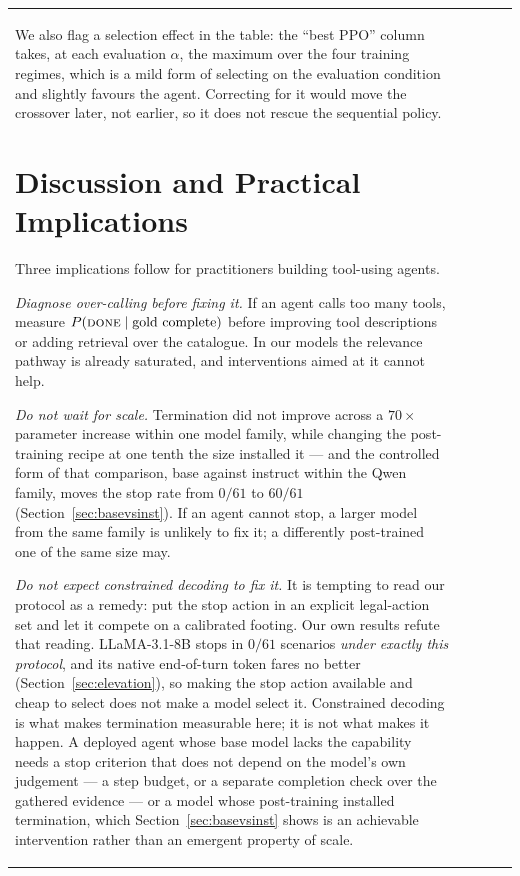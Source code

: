 \documentclass[11pt]{article}
\newcommand{\done}{\ensuremath{\text{\textsc{done}}}}
\begin{document}
\begin{table}[t]
\begin{tabular}{lcccc}
We also flag a selection effect in the table: the ``best PPO'' column takes, at
each evaluation $\alpha$, the maximum over the four training regimes, which is a
mild form of selecting on the evaluation condition and slightly favours the agent.
Correcting for it would move the crossover later, not earlier, so it does not
rescue the sequential policy.

\section{Discussion and Practical Implications}

Three implications follow for practitioners building tool-using agents.

\emph{Diagnose over-calling before fixing it.} If an agent calls too many tools,
measure $P(\done \mid \text{gold complete})$ before improving tool descriptions or
adding retrieval over the catalogue. In our models the relevance pathway is already
saturated, and interventions aimed at it cannot help.

\emph{Do not wait for scale.} Termination did not improve across a $70\times$
parameter increase within one model family, while changing the post-training
recipe at one tenth the size installed it --- and the controlled form of that
comparison, base against instruct within the Qwen family, moves the stop rate from
$0/61$ to $60/61$ (Section~\ref{sec:basevsinst}). If an agent cannot stop, a
larger model from the same family is unlikely to fix it; a differently
post-trained one of the same size may.

\emph{Do not expect constrained decoding to fix it.} It is tempting to read our
protocol as a remedy: put the stop action in an explicit legal-action set and let
it compete on a calibrated footing. Our own results refute that reading.
LLaMA-3.1-8B stops in $0/61$ scenarios \emph{under exactly this protocol}, and its
native end-of-turn token fares no better (Section~\ref{sec:elevation}), so making
the stop action available and cheap to select does not make a model select it.
Constrained decoding is what makes termination measurable here; it is not what
makes it happen. A deployed agent whose base model lacks the capability needs a
stop criterion that does not depend on the model's own judgement --- a step
budget, or a separate completion check over the gathered evidence --- or a model
whose post-training installed termination, which Section~\ref{sec:basevsinst}
shows is an achievable intervention rather than an emergent property of scale.


\end{tabular}
\end{table}
\end{document}
